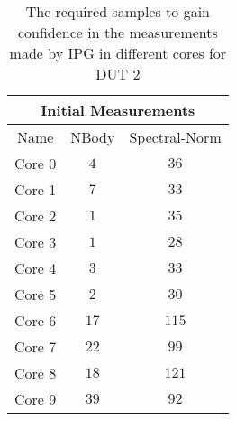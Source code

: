 \begin{table}[H]
    \centering
    \begin{tabular}{|| c | c | c ||}
    \hline
    \multicolumn{3}{||c||}{Initial Measurements} \\ [0.5ex] \hline\hline
    Name & NBody & Spectral-Norm \\\hline
    Core 0 & $4$ & $36$ \\
    Core 1 & $7$ & $33$ \\
    Core 2 & $1$ & $35$ \\
    Core 3 & $1$ & $28$ \\
    Core 4 & $3$ & $33$ \\
    Core 5 & $2$ & $30$ \\
    Core 6 & $17$ & $115$ \\
    Core 7 & $22$ & $99$ \\
    Core 8 & $18$ & $121$ \\
    Core 9 & $39$ & $92$ \\\hline
    \end{tabular}
    \caption{The required samples to gain confidence in the measurements made by IPG in different cores for DUT 2}
    \label{tab:initial-measurements-exp-3-dut-2}
\end{table}